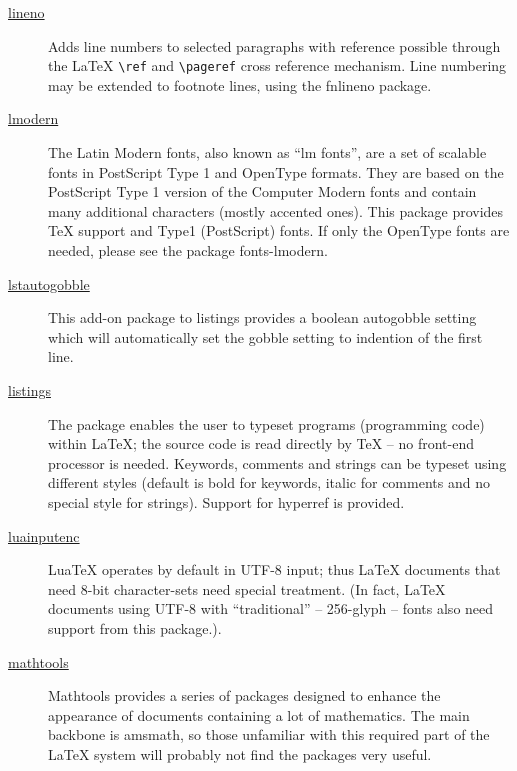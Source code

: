 \begin{description}
	\item[\href{https://www.ctan.org/pkg/lineno}{lineno}] Adds line numbers to selected paragraphs with reference possible through the {\LaTeX} \verb|\ref| and \verb|\pageref| cross reference mechanism. Line numbering may be extended to footnote lines, using the fnlineno package. \cite{CTANTeam.2020bv}
	
	\item[\href{https://www.ctan.org/tex-archive/info/lmodern}{lmodern}] The Latin Modern fonts, also known as \enquote{lm fonts}, are a set of scalable fonts in PostScript Type 1 and OpenType formats. They are based on the PostScript Type 1 version of the Computer Modern fonts and contain many additional characters (mostly accented ones). This package provides {\TeX} support and Type1 (PostScript) fonts. If only the OpenType fonts are needed, please see the package fonts-lmodern. \cite{CTANTeam.2020bn}
	
	\item[\href{https://www.ctan.org/pkg/lstaddons}{lstautogobble}] This add-on package to listings provides a boolean autogobble setting which will automatically set the gobble setting to indention of the first line. \cite{CTANTeam.2020bd}
	
	\item[\href{https://www.ctan.org/pkg/listings}{listings}] The package enables the user to typeset programs (programming code) within {\LaTeX}; the source code is read directly by {\TeX} -- no front-end processor is needed. Keywords, comments and strings can be typeset using different styles (default is bold for keywords, italic for comments and no special style for strings). Support for hyperref is provided. \cite{CTANTeam.2020z}
	
	\item[\href{https://www.ctan.org/pkg/luainputenc}{luainputenc}] Lua{\TeX} operates by default in UTF-8 input; thus {\LaTeX} documents that need 8-bit character-sets need special treatment. (In fact, {\LaTeX} documents using UTF-8 with \enquote{traditional} -- 256-glyph -- fonts also need support from this package.). \cite{CTANTeam.2020ak}
	
	\item[\href{https://www.ctan.org/pkg/mathtools}{mathtools}] Mathtools provides a series of packages designed to enhance the appearance of documents containing a lot of mathematics. The main backbone is amsmath, so those unfamiliar with this required part of the {\LaTeX} system will probably not find the packages very useful. \cite{CTANTeam.2020bk}
	

\end{description}
